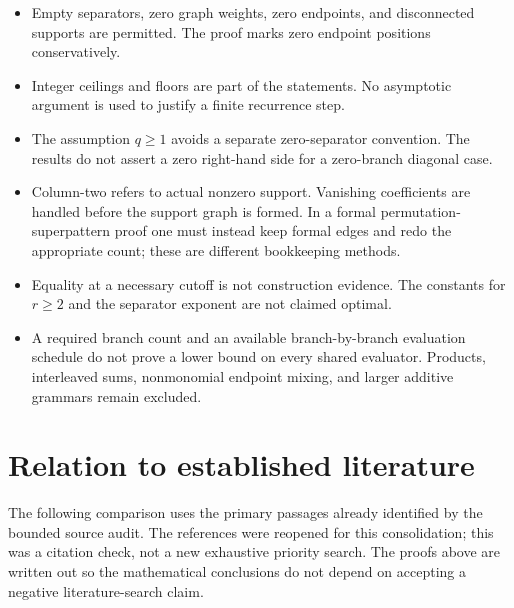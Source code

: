 \documentclass[
  11pt,
]{article}
\providecommand{\tightlist}{%
  \setlength{\itemsep}{0pt}\setlength{\parskip}{0pt}}
\begin{document}
\begin{itemize}
\tightlist
\item
  Empty separators, zero graph weights, zero endpoints, and disconnected
  supports are permitted. The proof marks zero endpoint positions
  conservatively.
\item
  Integer ceilings and floors are part of the statements. No asymptotic
  argument is used to justify a finite recurrence step.
\item
  The assumption \(q\ge1\) avoids a separate zero-separator convention.
  The results do not assert a zero right-hand side for a zero-branch
  diagonal case.
\item
  Column-two refers to actual nonzero support. Vanishing coefficients
  are handled before the support graph is formed. In a formal
  permutation-superpattern proof one must instead keep formal edges and
  redo the appropriate count; these are different bookkeeping methods.
\item
  Equality at a necessary cutoff is not construction evidence. The
  constants for \(r\ge2\) and the separator exponent are not claimed
  optimal.
\item
  A required branch count and an available branch-by-branch evaluation
  schedule do not prove a lower bound on every shared evaluator.
  Products, interleaved sums, nonmonomial endpoint mixing, and larger
  additive grammars remain excluded.
\end{itemize}

\section{Relation to established
literature}\label{relation-to-established-literature}

The following comparison uses the primary passages already identified by
the bounded source audit. The references were reopened for this
consolidation; this was a citation check, not a new exhaustive priority
search. The proofs above are written out so the mathematical conclusions
do not depend on accepting a negative literature-search claim.
\end{document}
